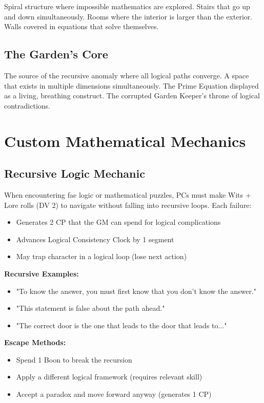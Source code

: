 \documentclass[11pt]{article}
\begin{document}
Spiral structure where impossible mathematics are explored. Stairs that go up and down simultaneously. Rooms where the interior is larger than the exterior. Walls covered in equations that solve themselves.

\subsection{The Garden's Core}

The source of the recursive anomaly where all logical paths converge. A space that exists in multiple dimensions simultaneously. The Prime Equation displayed as a living, breathing construct. The corrupted Garden Keeper's throne of logical contradictions.

\section{Custom Mathematical Mechanics}

\subsection{Recursive Logic Mechanic}

When encountering fae logic or mathematical puzzles, PCs must make Wits + Lore rolls (DV 2) to navigate without falling into recursive loops. Each failure:
\begin{itemize}
\item Generates 2 CP that the GM can spend for logical complications
\item Advances Logical Consistency Clock by 1 segment
\item May trap character in a logical loop (lose next action)
\end{itemize}

\textbf{Recursive Examples:}
\begin{itemize}
\item "To know the answer, you must first know that you don't know the answer."
\item "This statement is false about the path ahead."
\item "The correct door is the one that leads to the door that leads to..."
\end{itemize}

\textbf{Escape Methods:}
\begin{itemize}
\item Spend 1 Boon to break the recursion
\item Apply a different logical framework (requires relevant skill)
\item Accept a paradox and move forward anyway (generates 1 CP)
\end{itemize}
\end{document}

